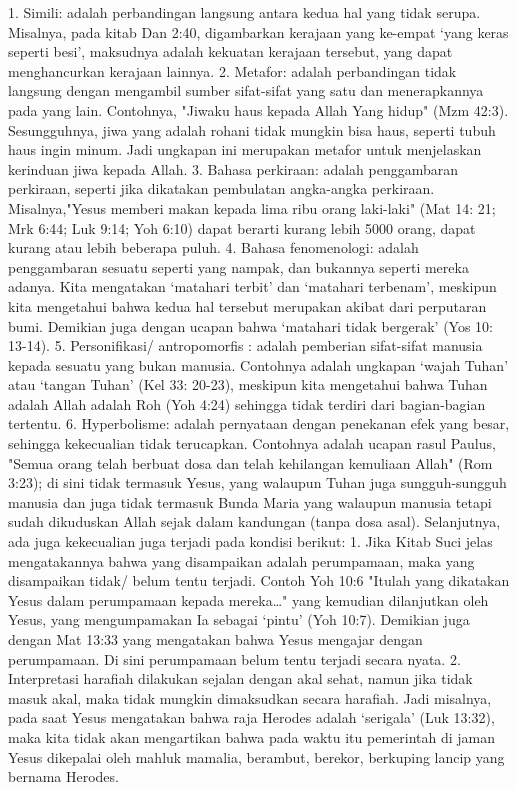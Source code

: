 1.    Simili: adalah perbandingan langsung antara kedua hal yang tidak serupa. Misalnya, pada kitab Dan 2:40, digambarkan kerajaan yang ke-empat ‘yang keras seperti besi’, maksudnya adalah kekuatan kerajaan tersebut, yang dapat menghancurkan kerajaan lainnya.
2.    Metafor: adalah perbandingan tidak langsung dengan mengambil sumber sifat-sifat yang satu dan menerapkannya pada yang lain. Contohnya, "Jiwaku haus kepada Allah Yang hidup" (Mzm 42:3). Sesungguhnya, jiwa yang adalah rohani tidak mungkin bisa haus, seperti tubuh haus ingin minum. Jadi ungkapan ini merupakan metafor untuk menjelaskan kerinduan jiwa kepada Allah.
3.    Bahasa perkiraan: adalah penggambaran perkiraan, seperti jika dikatakan pembulatan angka-angka perkiraan. Misalnya,"Yesus memberi makan kepada lima ribu orang laki-laki" (Mat 14: 21; Mrk 6:44; Luk 9:14; Yoh 6:10) dapat berarti kurang lebih 5000 orang, dapat kurang atau lebih beberapa puluh.
4.    Bahasa fenomenologi: adalah penggambaran sesuatu seperti yang nampak, dan bukannya seperti mereka adanya. Kita mengatakan ‘matahari terbit’ dan ‘matahari terbenam’, meskipun kita mengetahui bahwa kedua hal tersebut merupakan akibat dari perputaran bumi. Demikian juga dengan ucapan bahwa ‘matahari tidak bergerak’ (Yos 10: 13-14).
5.    Personifikasi/ antropomorfis : adalah pemberian sifat-sifat manusia kepada sesuatu yang bukan manusia. Contohnya adalah ungkapan ‘wajah Tuhan’ atau ‘tangan Tuhan’ (Kel 33: 20-23), meskipun kita mengetahui bahwa Tuhan adalah Allah adalah Roh (Yoh 4:24) sehingga tidak terdiri dari bagian-bagian tertentu.
6.    Hyperbolisme: adalah pernyataan dengan penekanan efek yang besar, sehingga kekecualian tidak terucapkan. Contohnya adalah ucapan rasul Paulus, "Semua orang telah berbuat dosa dan telah kehilangan kemuliaan Allah" (Rom 3:23); di sini tidak termasuk Yesus, yang walaupun Tuhan juga sungguh-sungguh manusia dan juga tidak termasuk Bunda Maria yang walaupun manusia tetapi sudah dikuduskan Allah sejak dalam kandungan (tanpa dosa asal).
Selanjutnya, ada juga kekecualian juga terjadi pada kondisi berikut:
1.    Jika Kitab Suci jelas mengatakannya bahwa yang disampaikan adalah perumpamaan, maka yang disampaikan tidak/ belum tentu terjadi. Contoh Yoh 10:6 "Itulah yang dikatakan Yesus dalam perumpamaan kepada mereka…" yang kemudian dilanjutkan oleh Yesus, yang mengumpamakan Ia sebagai ‘pintu’ (Yoh 10:7). Demikian juga dengan Mat 13:33 yang mengatakan bahwa Yesus mengajar dengan perumpamaan. Di sini perumpamaan belum tentu terjadi secara nyata.
2.    Interpretasi harafiah dilakukan sejalan dengan akal sehat, namun jika tidak masuk akal, maka tidak mungkin dimaksudkan secara harafiah. Jadi misalnya, pada saat Yesus mengatakan bahwa raja Herodes adalah ‘serigala’ (Luk 13:32), maka kita tidak akan mengartikan bahwa pada waktu itu pemerintah di jaman Yesus dikepalai oleh mahluk mamalia, berambut, berekor, berkuping lancip yang bernama Herodes.
